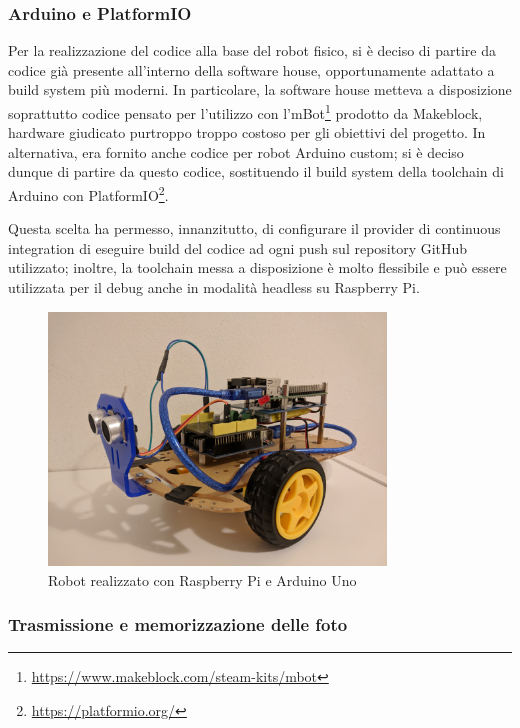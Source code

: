 \subsubsection{Arduino e PlatformIO}

Per la realizzazione del codice alla base del robot fisico, si è deciso di partire da codice già presente all'interno della software house, opportunamente adattato a build system più moderni.
In particolare, la software house metteva a disposizione soprattutto codice pensato per l'utilizzo con l'mBot\footnote{\url{https://www.makeblock.com/steam-kits/mbot}} prodotto da Makeblock, hardware giudicato purtroppo troppo costoso per gli obiettivi del progetto.
In alternativa, era fornito anche codice per robot Arduino custom; si è deciso dunque di partire da questo codice, sostituendo il build system della toolchain di Arduino con PlatformIO\footnote{\url{https://platformio.org/}}.

Questa scelta ha permesso, innanzitutto, di configurare il provider di continuous integration di eseguire build del codice ad ogni push sul repository GitHub utilizzato;
inoltre, la toolchain messa a disposizione è molto flessibile e può essere utilizzata per il debug anche in modalità headless su Raspberry Pi.

\begin{figure}[H]
  \centering
  \includegraphics[width=0.8\textwidth]{res/sprint4/robot-angle.jpg}%
  \caption{Robot realizzato con Raspberry Pi e Arduino Uno}%
  \label{fig:sp4:robot-hw}
\end{figure}

\subsubsection{Trasmissione e memorizzazione delle foto}

